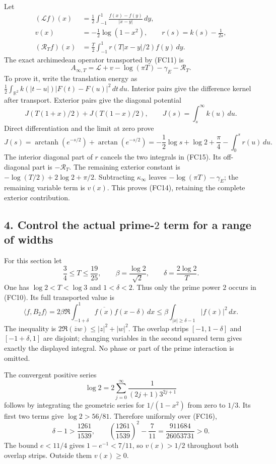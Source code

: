 \documentclass[
  10pt,
  a4paper,
]{article}
\begin{document}
Let \[
\begin{aligned}
(\mathcal Lf)(x)&=\frac12\int_{-1}^1
\frac{f(x)-f(y)}{|x-y|}\,dy,\\
v(x)&=-\frac12\log(1-x^2),\qquad
r(s)=k(s)-\frac1{2s},\\
(\mathcal R_Tf)(x)&=\frac T2\int_{-1}^1
r(T|x-y|/2)f(y)\,dy.
\end{aligned}
\tag{FC13}
\] The exact archimedean operator transported by (FC11) is \[
\boxed{
A_{\infty,T}=\mathcal L+v-\log(\pi T)-\gamma_E-\mathcal R_T.
}
\tag{FC14}
\] To prove it, write the translation energy as
\(\frac12\int_{\mathbb R^2}k(|t-u|)|F(t)-F(u)|^2\,dt\,du\). Interior
pairs give the difference kernel after transport. Exterior pairs give
the diagonal potential \[
J(T(1+x)/2)+J(T(1-x)/2),\qquad
J(s)=\int_s^\infty k(u)\,du.
\] Direct differentiation and the limit at zero prove \[
J(s)=\operatorname{arctanh}(e^{-s/2})
+\arctan(e^{-s/2})
=-\frac12\log s+\log2+\frac\pi4-\int_0^s r(u)\,du.
\tag{FC15}
\] The interior diagonal part of \(r\) cancels the two integrals in
(FC15). Its off-diagonal part is \(-\mathcal R_T\). The remaining
exterior constant is \(-\log(T/2)+2\log2+\pi/2\). Subtracting
\(\kappa_\infty\) leaves \(-\log(\pi T)-\gamma_E\); the remaining
variable term is \(v(x)\). This proves (FC14), retaining the complete
exterior contribution.

\subsection{\texorpdfstring{4. Control the actual prime-\(2\) term for a
range of
widths}{4. Control the actual prime-2 term for a range of widths}}\label{control-the-actual-prime-2-term-for-a-range-of-widths}

For this section let \[
\frac34\le T\le\frac{19}{25},\qquad
\beta=\frac{\log2}{\sqrt2},\qquad
\delta=\frac{2\log2}{T}.
\tag{FC16}
\] One has \(\log2<T<\log3\) and \(1<\delta<2\). Thus only the prime
power \(2\) occurs in (FC10). Its full transported value is \[
\langle f,B_2f\rangle=
2\beta\Re\int_{-1+\delta}^1\overline{f(x)}f(x-\delta)\,dx
\le\beta\int_{|x|\ge\delta-1}|f(x)|^2\,dx.
\tag{FC17}
\] The inequality is \(2\Re(\overline zw)\le|z|^2+|w|^2\). The overlap
strips \([-1,1-\delta]\) and \([-1+\delta,1]\) are disjoint; changing
variables in the second squared term gives exactly the displayed
integral. No phase or part of the prime interaction is omitted.

The convergent positive series \[
\log2=2\sum_{j=0}^\infty\frac1{(2j+1)3^{2j+1}}
\tag{FC18}
\] follows by integrating the geometric series for \(1/(1-x^2)\) from
zero to \(1/3\). Its first two terms give \(\log2>56/81\). Therefore
uniformly over (FC16), \[
\delta-1>\frac{1261}{1539},\qquad
\left(\frac{1261}{1539}\right)^2-\frac7{11}
=\frac{911684}{26053731}>0.
\] The bound \(e<11/4\) gives \(1-e^{-1}<7/11\), so \(v(x)>1/2\)
throughout both overlap strips. Outside them \(v(x)\ge0\).
\end{document}
